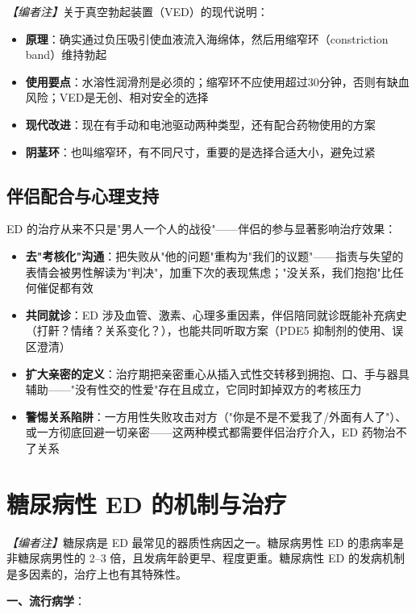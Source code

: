 \documentclass[12pt,a4paper,twoside]{ctexbook}
\begin{document}
\noindent\textit{【编者注】}关于真空勃起装置（VED）的现代说明：
\begin{itemize}
	\item \textbf{原理}：确实通过负压吸引使血液流入海绵体，然后用缩窄环（constriction band）维持勃起
	\item \textbf{使用要点}：水溶性润滑剂是必须的；缩窄环不应使用超过30分钟，否则有缺血风险；VED是无创、相对安全的选择
	\item \textbf{现代改进}：现在有手动和电池驱动两种类型，还有配合药物使用的方案
	\item \textbf{阴茎环}：也叫缩窄环，有不同尺寸，重要的是选择合适大小，避免过紧
\end{itemize}
\subsection{伴侣配合与心理支持}


ED 的治疗从来不只是"男人一个人的战役"——伴侣的参与显著影响治疗效果：

\begin{itemize}
	\item \textbf{去"考核化"沟通}：把失败从"他的问题"重构为"我们的议题"——指责与失望的表情会被男性解读为"判决"，加重下次的表现焦虑；"没关系，我们抱抱"比任何催促都有效
	\item \textbf{共同就诊}：ED 涉及血管、激素、心理多重因素，伴侣陪同就诊既能补充病史（打鼾？情绪？关系变化？），也能共同听取方案（PDE5 抑制剂的使用、误区澄清）
	\item \textbf{扩大亲密的定义}：治疗期把亲密重心从插入式性交转移到拥抱、口、手与器具辅助——"没有性交的性爱"存在且成立，它同时卸掉双方的考核压力
	\item \textbf{警惕关系陷阱}：一方用性失败攻击对方（"你是不是不爱我了/外面有人了"）、或一方彻底回避一切亲密——这两种模式都需要伴侣治疗介入，ED 药物治不了关系
\end{itemize}


\section{糖尿病性 ED 的机制与治疗}


\label{sec:diabetic_ed}

\noindent\textit{【编者注】}糖尿病是 ED 最常见的器质性病因之一。糖尿病男性 ED 的患病率是非糖尿病男性的 2--3 倍，且发病年龄更早、程度更重。糖尿病性 ED 的发病机制是多因素的，治疗上也有其特殊性。

\vspace{0.5em}
\noindent\textbf{一、流行病学}：
\end{document}
